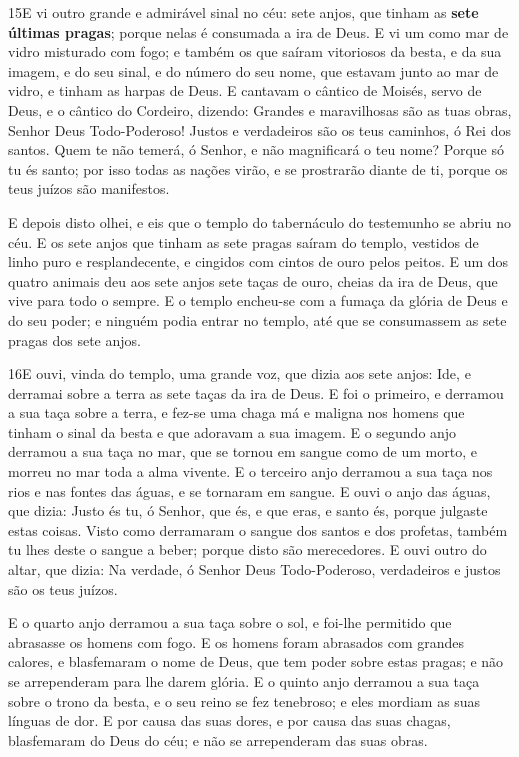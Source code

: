 \medskip

\lettrine{15} E vi outro grande e admirável sinal no céu: sete
anjos, que tinham as \textbf{sete últimas pragas}; porque nelas é
consumada a ira de Deus. E vi um como mar de vidro misturado com
fogo; e também os que saíram vitoriosos da besta, e da sua imagem, e
do seu sinal, e do número do seu nome, que estavam junto ao mar de
vidro, e tinham as harpas de Deus. E cantavam o cântico de
Moisés, servo de Deus, e o cântico do Cordeiro, dizendo: Grandes e
maravilhosas são as tuas obras, Senhor Deus Todo-Poderoso! Justos e
verdadeiros são os teus caminhos, ó Rei dos santos. Quem te não
temerá, ó Senhor, e não magnificará o teu nome? Porque só tu és
santo; por isso todas as nações virão, e se prostrarão diante de ti,
porque os teus juízos são manifestos.

E depois disto olhei, e eis que o templo do tabernáculo do
testemunho se abriu no céu. E os sete anjos que tinham as sete
pragas saíram do templo, vestidos de linho puro e resplandecente, e
cingidos com cintos de ouro pelos peitos. E um dos quatro
animais deu aos sete anjos sete taças de ouro, cheias da ira de
Deus, que vive para todo o sempre. E o templo encheu-se com a
fumaça da glória de Deus e do seu poder; e ninguém podia entrar no
templo, até que se consumassem as sete pragas dos sete anjos.

\medskip

\lettrine{16} E ouvi, vinda do templo, uma grande voz, que
dizia aos sete anjos: Ide, e derramai sobre a terra as sete taças da
ira de Deus. E foi o primeiro, e derramou a sua taça sobre a
terra, e fez-se uma chaga má e maligna nos homens que tinham o sinal
da besta e que adoravam a sua imagem. E o segundo anjo derramou
a sua taça no mar, que se tornou em sangue como de um morto, e
morreu no mar toda a alma vivente. E o terceiro anjo derramou a
sua taça nos rios e nas fontes das águas, e se tornaram em sangue.
E ouvi o anjo das águas, que dizia: Justo és tu, ó Senhor, que
és, e que eras, e santo és, porque julgaste estas coisas. Visto
como derramaram o sangue dos santos e dos profetas, também tu lhes
deste o sangue a beber; porque disto são merecedores. E ouvi
outro do altar, que dizia: Na verdade, ó Senhor Deus Todo-Poderoso,
verdadeiros e justos são os teus juízos.

E o quarto anjo derramou a sua taça sobre o sol, e foi-lhe
permitido que abrasasse os homens com fogo. E os homens foram
abrasados com grandes calores, e blasfemaram o nome de Deus, que tem
poder sobre estas pragas; e não se arrependeram para lhe darem
glória. E o quinto anjo derramou a sua taça sobre o trono da
besta, e o seu reino se fez tenebroso; e eles mordiam as suas
línguas de dor. E por causa das suas dores, e por causa das
suas chagas, blasfemaram do Deus do céu; e não se arrependeram das
suas obras.

